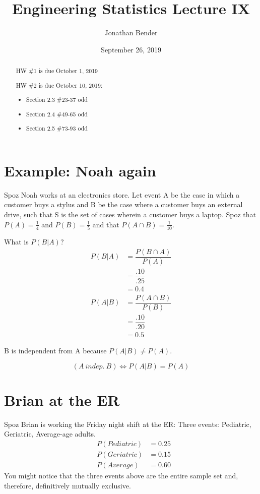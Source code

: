 \documentclass[]{article}
\title{Engineering Statistics Lecture IX}
\author{Jonathan Bender}
\date{September 26, 2019}
\begin{document}
	
	\maketitle
	
	\begin{abstract}
		HW \#1 is due October 1, 2019
		
		HW \#2 is due October 10, 2019:
		\begin{itemize}
			\item Section 2.3 \#23-37 odd
			\item Section 2.4 \#49-65 odd
			\item Section 2.5 \#73-93 odd
		\end{itemize}
	\end{abstract}
	
	\section{Example: Noah again}
	
		Spoz Noah works at an electronics store. Let event A be the case in which a customer buys a stylus and B be the case where a customer buys an external drive, such that S is the set of cases wherein a customer buys a laptop.
		Spoz that $P(A) = \frac{1}{4}$ and $P(B) = \frac{1}{5}$ and that $P(A\cap B) = \frac{1}{10}$.
		
		What is $P(B|A)$?
		\begin{align*}
		P(B|A) &= \dfrac{P(B\cap A)}{P(A)}
		     \\&= \dfrac{.10}{.25}
		     \\&= 0.4\\
		P(A|B) &= \dfrac{P(A\cap B)}{P(B)}
		     \\&= \dfrac{.10}{.20}
		     \\&= 0.5
		\end{align*}
		
		B is independent from A because $P(A|B)\neq P(A)$.
		
		\begin{equation}
		(A\ indep.\ B) \iff P(A|B) = P(A)
		\label{Formula of Independence}
		\end{equation}
	
	\section{Brian at the ER}
	
		Spoz Brian is working the Friday night shift at the ER: Three events: Pediatric, Geriatric, Average-age adults.
		\begin{align*}
			&P(Pediatric) &= 0.25 \\
			&P(Geriatric) &= 0.15 \\
			&P(Average)   &= 0.60
		\end{align*}
		You might notice that the three events above are the entire sample set and, therefore, definitively mutually exclusive.
		
\end{document}
